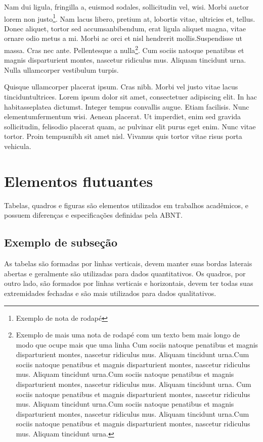 \documentclass{jornada} %
\begin{document}
Nam dui ligula, fringilla a, euismod sodales, sollicitudin vel, wisi. Morbi auctor lorem non justo\footnote{Exemplo de nota de rodapé }. Nam lacus libero, pretium at, lobortis vitae, ultricies et, tellus.  Donec aliquet, tortor sed accumsanbibendum, erat ligula aliquet magna, vitae ornare odio metus a mi. Morbi ac orci et nisl hendrerit mollis.Suspendisse ut massa. Cras nec ante. Pellentesque a nulla\footnote{Exemplo de mais uma nota de rodapé com um texto bem mais longo de modo que ocupe mais que uma linha Cum sociis natoque penatibus et magnis disparturient montes, nascetur ridiculus mus. Aliquam tincidunt urna.Cum sociis natoque penatibus et magnis disparturient montes, nascetur ridiculus mus. Aliquam tincidunt urna.Cum sociis natoque penatibus et magnis disparturient montes, nascetur ridiculus mus. Aliquam tincidunt urna. Cum sociis natoque penatibus et magnis disparturient montes, nascetur ridiculus mus. Aliquam tincidunt urna.Cum sociis natoque penatibus et magnis disparturient montes, nascetur ridiculus mus. Aliquam tincidunt urna.Cum sociis natoque penatibus et magnis disparturient montes, nascetur ridiculus mus. Aliquam tincidunt urna.}. Cum sociis natoque penatibus et magnis disparturient montes, nascetur ridiculus mus. Aliquam tincidunt urna. Nulla ullamcorper vestibulum turpis. 
\begin{citacao}
 Quisque ullamcorper placerat ipsum. Cras nibh. Morbi vel justo vitae lacus tinciduntultrices.  Lorem ipsum dolor sit amet, consectetuer adipiscing elit.  In hac habitasseplatea dictumst.  Integer tempus convallis augue.  Etiam facilisis.  Nunc elementumfermentum wisi.  Aenean placerat.  Ut imperdiet, enim sed gravida sollicitudin, felisodio placerat quam, ac pulvinar elit purus eget enim. Nunc vitae tortor. Proin tempusnibh sit amet nisl. Vivamus quis tortor vitae risus porta vehicula.
\end{citacao}

\lipsum[5]

\section{Elementos flutuantes}
Tabelas, quadros e figuras são elementos utilizados em trabalhos acadêmicos, e possuem diferenças e especificações definidas pela ABNT.

\subsection{Exemplo de subseção}
As tabelas são formadas por linhas verticais, devem manter suas bordas laterais abertas e geralmente são utilizadas para dados quantitativos. Os quadros, por outro lado, são formados por linhas verticais e horizontais, devem ter todas suas extremidades fechadas e são mais utilizados para dados qualitativos.
\end{document}
